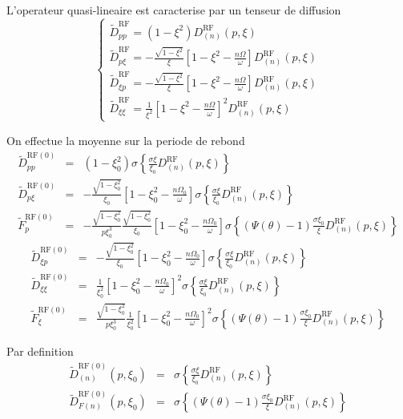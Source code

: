 L'operateur quasi-lineaire est caracterise par un tenseur de diffusion
\[
\left\{ \begin{array}{l}
\widetilde{D}_{pp}^{\text{RF}}=(1-\xi^{2})D_{(n)}^{\text{RF}}(p,\xi)\\
\widetilde{D}_{p\xi}^{\text{RF}}=-\frac{\sqrt{1-\xi^{2}}}{\xi}\left[1-\xi^{2}-\frac{n\Omega}{\omega}\right]D_{(n)}^{\text{RF}}(p,\xi)\\
\widetilde{D}_{\xi p}^{\text{RF}}=-\frac{\sqrt{1-\xi^{2}}}{\xi}\left[1-\xi^{2}-\frac{n\Omega}{\omega}\right]D_{(n)}^{\text{RF}}(p,\xi)\\
\widetilde{D}_{\xi\xi}^{\text{RF}}=\frac{1}{\xi^{2}}\left[1-\xi^{2}-\frac{n\Omega}{\omega}\right]^{2}D_{(n)}^{\text{RF}}(p,\xi)\end{array}\right.\]


On effectue la moyenne sur la periode de rebond \begin{eqnarray*}
\widetilde{D}_{pp}^{\text{RF}(0)} & = & (1-\xi_{0}^{2})\sigma\left\{ \frac{\sigma\xi}{\xi_{0}}D_{(n)}^{\text{RF}}(p,\xi)\right\} \\
\widetilde{D}_{p\xi}^{\text{RF}(0)} & = & -\frac{\sqrt{1-\xi_{0}^{2}}}{\xi_{0}}\left[1-\xi_{0}^{2}-\frac{n\Omega_{0}}{\omega}\right]\sigma\left\{ \frac{\sigma\xi}{\xi_{0}}D_{(n)}^{\text{RF}}(p,\xi)\right\} \\
\widetilde{F}_{p}^{\text{RF}(0)} & = & -\frac{\sqrt{1-\xi_{0}^{2}}}{p\xi_{0}^{3}}\frac{\sqrt{1-\xi_{0}^{2}}}{\xi_{0}}\left[1-\xi_{0}^{2}-\frac{n\Omega_{0}}{\omega}\right]\sigma\left\{ \left(\Psi(\theta)-1\right)\frac{\sigma\xi_{0}}{\xi}D_{(n)}^{\text{RF}}(p,\xi)\right\} \end{eqnarray*}
\begin{eqnarray*}
\widetilde{D}_{\xi p}^{\text{RF}(0)} & = & -\frac{\sqrt{1-\xi_{0}^{2}}}{\xi_{0}}\left[1-\xi_{0}^{2}-\frac{n\Omega_{0}}{\omega}\right]\sigma\left\{ \frac{\sigma\xi}{\xi_{0}}D_{(n)}^{\text{RF}}(p,\xi)\right\} \\
\widetilde{D}_{\xi\xi}^{\text{RF}(0)} & = & \frac{1}{\xi_{0}^{2}}\left[1-\xi_{0}^{2}-\frac{n\Omega_{0}}{\omega}\right]^{2}\sigma\left\{ \frac{\sigma\xi}{\xi_{0}}D_{(n)}^{\text{RF}}(p,\xi)\right\} \\
\widetilde{F}_{\xi}^{\text{RF}(0)} & = & \frac{\sqrt{1-\xi_{0}^{2}}}{p\xi_{0}^{3}}\frac{1}{\xi_{0}^{2}}\left[1-\xi_{0}^{2}-\frac{n\Omega_{0}}{\omega}\right]^{2}\sigma\left\{ \left(\Psi(\theta)-1\right)\frac{\sigma\xi_{0}}{\xi}D_{(n)}^{\text{RF}}(p,\xi)\right\} \end{eqnarray*}


Par definition \begin{eqnarray*}
\widetilde{D}_{(n)}^{\text{RF}(0)}(p,\xi_{0}) & = & \sigma\left\{ \frac{\sigma\xi}{\xi_{0}}D_{(n)}^{\text{RF}}(p,\xi)\right\} \\
\widetilde{D}_{F(n)}^{\text{RF}(0)}(p,\xi_{0}) & = & \sigma\left\{ \left(\Psi(\theta)-1\right)\frac{\sigma\xi_{0}}{\xi}D_{(n)}^{\text{RF}}(p,\xi)\right\} \end{eqnarray*}


